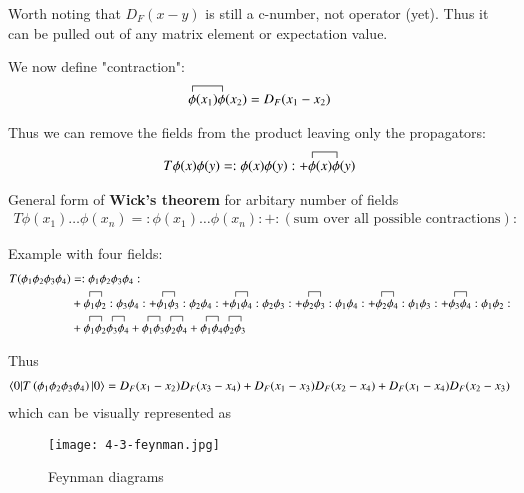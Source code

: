 Worth noting that $D_F(x-y)$ is still a c-number, not operator (yet). Thus it can be pulled out of any matrix element or expectation value.

We now define "contraction":
\begin{align}
	\contraction[1ex]{}{\phi}{(x_1)}{\phi}	\phi(x_1) \phi(x_2) = D_F(x_1-x_2)
\end{align}

Thus we can remove the fields from the product leaving only the propagators:
\begin{align}
	T\phi(x)\phi(y) = :\phi(x)\phi(y): +  \contraction[1ex]{}{\phi}{(x)}{\phi}	\phi(x) \phi(y)
\end{align}

General form of \textbf{Wick's theorem} for arbitary number of fields
\begin{align}
	T\phi(x_1)\dots \phi(x_n) = :\phi(x_1)\dots \phi(x_n):	 + :\left( \text{sum over all possible contractions} \right):
\end{align}

Example with four fields:
\begin{align*}
	T(\phi_1 \phi_2 \phi_3 \phi_4) &= :\phi_1 \phi_2 \phi_3 \phi_4: \\
								   & + \contraction{}{\phi_1}{}{\phi_2} \phi_1 \phi_2 :\phi_3 \phi_4: + \contraction{}{\phi_1}{}{\phi_3} \phi_1 \phi_3 :\phi_2 \phi_4: + \contraction{}{\phi_1}{}{\phi_4} \phi_1 \phi_4 :\phi_2 \phi_3: +  \contraction{}{\phi_2}{}{\phi_3} \phi_2 \phi_3 :\phi_1 \phi_4: + \contraction{}{\phi_2}{}{\phi_4} \phi_2 \phi_4 :\phi_1 \phi_3: + \contraction{}{\phi_3}{}{\phi_4} \phi_3 \phi_4 :\phi_1 \phi_2: \\
	&+ \contraction{}{\phi_1}{}{\phi_2} \phi_1 \phi_2 \contraction{}{\phi_3}{}{\phi_4}\phi_3 \phi_4 + \contraction{}{\phi_1}{}{\phi_3} \phi_1 \phi_3 \contraction{}{\phi_2}{}{\phi_4}\phi_2 \phi_4 + \contraction{}{\phi_1}{}{\phi_4} \phi_1 \phi_4 \contraction{}{\phi_2}{}{\phi_3}\phi_2 \phi_3
\end{align*}

Thus 
\begin{align*}
	\braket{ 0 | T \left(\phi_1 \phi_2 \phi_3 \phi_4 \right) | 0} = D_F (x_1 - x_2) D_F(x_3 - x_4) + D_F (x_1 - x_3) D_F(x_2 - x_4) + D_F (x_1 - x_4) D_F(x_2 - x_3) 
\end{align*}
which can be visually represented as
\begin{figure}[ht]
	\centering
	\texttt{[image: 4-3-feynman.jpg]}
	\caption{Feynman diagrams}
	\label{fig:4-3-feynman}
\end{figure}
